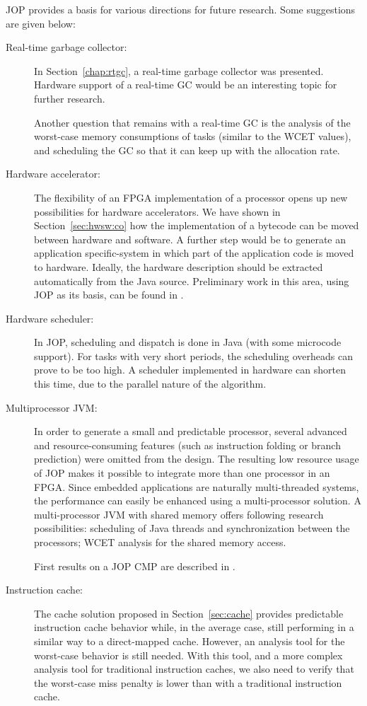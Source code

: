 JOP provides a basis for various directions for future research.
Some suggestions are given below:
%
\begin{description}
    \item[Real-time garbage collector:]
In Section~\ref{chap:rtgc}, a real-time garbage collector was
presented. Hardware support of a real-time GC would be an
interesting topic for further research.

Another question that remains with a real-time GC is the analysis of
the worst-case memory consumptions of tasks (similar to the WCET
values), and scheduling the GC so that it can keep up with the
allocation rate.

    \item[Hardware accelerator:]
The flexibility of an FPGA implementation of a processor opens up
new possibilities for hardware accelerators. We have shown in
Section~\ref{sec:hwsw:co} how the implementation of a bytecode can
be moved between hardware and software. A further step would be to
generate an application specific-system in which part of the
application code is moved to hardware. Ideally, the hardware
description should be extracted automatically from the Java source.
Preliminary work in this area, using JOP as its basis, can be found
in \cite{jop:sac05}.

    \item[Hardware scheduler:]
In JOP, scheduling and dispatch is done in Java (with some microcode
support). For tasks with very short periods, the scheduling
overheads can prove to be too high. A scheduler implemented in
hardware can shorten this time, due to the parallel nature of the
algorithm.

    \item[Multiprocessor JVM:]
In order to generate a small and predictable processor, several
advanced and resource-consuming features (such as instruction
folding or branch prediction) were omitted from the design. The
resulting low resource usage of JOP makes it possible to integrate
more than one processor in an FPGA. Since embedded applications are
naturally multi-threaded systems, the performance can easily be
enhanced using a multi-processor solution. A multi-processor JVM
with shared memory offers following research possibilities:
scheduling of Java threads and synchronization between the
processors; WCET analysis for the shared memory access.

First results on a JOP CMP are described in \cite{jop:dma, jop:cmp}.

    \item[Instruction cache:]
The cache solution proposed in Section~\ref{sec:cache} provides
predictable instruction cache behavior while, in the average case,
still performing in a similar way to a direct-mapped cache. However,
an analysis tool for the worst-case behavior is still needed. With
this tool, and a more complex analysis tool for traditional
instruction caches, we also need to verify that the worst-case miss
penalty is lower than with a traditional instruction cache.


\end{description}
